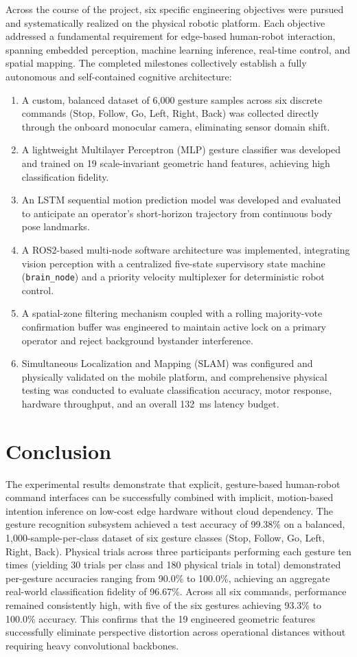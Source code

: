 Across the course of the project, six specific engineering objectives were pursued and systematically realized on the physical robotic platform. Each objective addressed a fundamental requirement for edge-based human-robot interaction, spanning embedded perception, machine learning inference, real-time control, and spatial mapping. The completed milestones collectively establish a fully autonomous and self-contained cognitive architecture:
\begin{enumerate}
    \item A custom, balanced dataset of 6,000 gesture samples across six discrete commands (Stop, Follow, Go, Left, Right, Back) was collected directly through the onboard monocular camera, eliminating sensor domain shift.
    \item A lightweight Multilayer Perceptron (MLP) gesture classifier was developed and trained on 19 scale-invariant geometric hand features, achieving high classification fidelity.
    \item An LSTM sequential motion prediction model was developed and evaluated to anticipate an operator's short-horizon trajectory from continuous body pose landmarks.
    \item A ROS2-based multi-node software architecture was implemented, integrating vision perception with a centralized five-state supervisory state machine (\texttt{brain\_node}) and a priority velocity multiplexer for deterministic robot control.
    \item A spatial-zone filtering mechanism coupled with a rolling majority-vote confirmation buffer was engineered to maintain active lock on a primary operator and reject background bystander interference.
    \item Simultaneous Localization and Mapping (SLAM) was configured and physically validated on the mobile platform, and comprehensive physical testing was conducted to evaluate classification accuracy, motor response, hardware throughput, and an overall 132~ms latency budget.
\end{enumerate}

\section{Conclusion}
The experimental results demonstrate that explicit, gesture-based human-robot command interfaces can be successfully combined with implicit, motion-based intention inference on low-cost edge hardware without cloud dependency. The gesture recognition subsystem achieved a test accuracy of 99.38\% on a balanced, 1,000-sample-per-class dataset of six gesture classes (Stop, Follow, Go, Left, Right, Back). Physical trials across three participants performing each gesture ten times (yielding 30 trials per class and 180 physical trials in total) demonstrated per-gesture accuracies ranging from 90.0\% to 100.0\%, achieving an aggregate real-world classification fidelity of 96.67\%. Across all six commands, performance remained consistently high, with five of the six gestures achieving 93.3\% to 100.0\% accuracy. This confirms that the 19 engineered geometric features successfully eliminate perspective distortion across operational distances without requiring heavy convolutional backbones.

